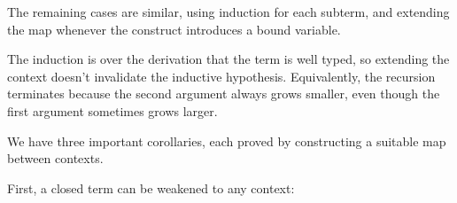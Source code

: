 The remaining cases are similar, using induction for each subterm, and
extending the map whenever the construct introduces a bound variable.

The induction is over the derivation that the term is well typed, so
extending the context doesn't invalidate the inductive hypothesis.
Equivalently, the recursion terminates because the second argument
always grows smaller, even though the first argument sometimes grows
larger.

We have three important corollaries, each proved by constructing a
suitable map between contexts.

First, a closed term can be weakened to any context:

\begin{fence}
\begin{code}%
\>[0]\AgdaSpace{}%
\AgdaSymbol{:}\AgdaSpace{}%
\AgdaSpace{}%
\AgdaSymbol{\{}\AgdaSpace{}%
\AgdaSpace{}%
\AgdaSymbol{\}}\<%
\\
\>[0][@{}l@{\AgdaIndent{0}}]%
\>[2]%
\>[500I]\AgdaSpace{}%
\AgdaSpace{}%
\AgdaSpace{}%
\AgdaSpace{}%
\<%
\\
\>[.][@{}l@{}]\<[500I]%
\>[4]\AgdaComment{----------}\<%
\\
%
\>[2]\AgdaSpace{}%
\AgdaSpace{}%
\AgdaSpace{}%
\AgdaSpace{}%
\AgdaSpace{}%
\<%
\\
\>[0]\AgdaSpace{}%
\AgdaSymbol{\{}\AgdaSymbol{\}}\AgdaSpace{}%
\AgdaSpace{}%
\AgdaSymbol{=}\AgdaSpace{}%
\AgdaSpace{}%
\AgdaSpace{}%
\<%
\\
\>[0][@{}l@{\AgdaIndent{0}}]%
\>[2]\<%
\\
%
\>[2]%
\>[516I]\AgdaSymbol{:}\AgdaSpace{}%
\AgdaSpace{}%
\AgdaSymbol{\{}\AgdaSpace{}%
\AgdaSymbol{\}}\<%
\\
\>[.][@{}l@{}]\<[516I]%
\>[4]%
\>[520I]\AgdaSpace{}%
\AgdaSpace{}%
\AgdaSpace{}%
\AgdaSpace{}%
\<%
\\
\>[.][@{}l@{}]\<[520I]%
\>[6]\AgdaComment{---------}\<%
\\
%
\>[4]\AgdaSpace{}%
\AgdaSpace{}%
\AgdaSpace{}%
\AgdaSpace{}%
\AgdaSpace{}%
\<%
\\
%
\>[2]\AgdaSpace{}%
\AgdaSymbol{()}\<%
\end{code}
\end{fence}

